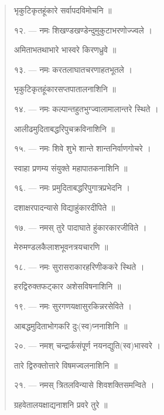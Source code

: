 \documentclass[a4paper, 11pt, oneside, french, landscape, twocolumn]{article}
\begin{document}
\begin{quotation}
\texthindi{भृकुटिकृतहूंकारे सर्वापदविमोचनि ॥}

\bigskip

\texthindi{१२}. --- \texthindi{नमः शिखण्डखण्डेन्दुमुकुटाभरणोज्ज्वले ।}

\texthindi{अमिताभतथाभारे भास्वरे किरणध्रुवे ॥}

\bigskip

\texthindi{१३}. --- \texthindi{नमः करतलाघातचरणाहतभूतले ।}

\texthindi{भृकुटिकृतहूंकारसप्तपातालनाशिनि ॥}

\bigskip

\texthindi{१४}. --- \texthindi{नमः कल्पान्तहुतभुग्ज्वालामालान्तरे स्थिते ।}

\texthindi{आलीढमुदिताबद्धरिपुचक्रविनाशिनि ॥}

\bigskip

\texthindi{१५}. --- \texthindi{नमः शिवे शुभे शान्ते शान्तनिर्वाणगोचरे ।}

\texthindi{स्वाहा प्रणम्य संयुक्ते महापातकनाशिनि ॥}

\bigskip

\texthindi{१६}. --- \texthindi{नमः प्रमुदिताबद्धरिपुगात्रप्रभेदनि ।}

\texthindi{दशाक्षरपादन्यासे विद्याहुंकारदीपिते ॥}

\bigskip

\texthindi{१७}. --- \texthindi{नमस् तुरे पादाघाते हुंकारकारजीविते ।}

\texthindi{मेरुमण्डलकैलाशभूवनत्रयचारणि ॥}

\bigskip

\texthindi{१८}. --- \texthindi{नमः सुरासराकारहरिणीककरे स्थिते ।}

\texthindi{हरद्विरुक्तफट्कार अशेसविषनाशिनि ॥}

\bigskip

\texthindi{१९}. --- \texthindi{नमः सुरगणयक्षासुरकिन्नरसेविते ।}

\texthindi{आबद्धमुदिताभोगकरि दुः(स्व)प्ननाशिनि ॥}

\bigskip

\texthindi{२०}. --- \texthindi{नमश् चन्द्रार्कसंपूर्ण नयनद्युति(स्व)भास्वरे ।}

\texthindi{तारे द्विरुक्तोत्तारे विषमज्वलनाशिनि ॥}

\bigskip

\texthindi{२१}. --- \texthindi{नमस् त्रितलविन्यासे शिवशक्तिसमन्विते ।}

\texthindi{ग्रहवेतालयक्षाद्यनाशनि प्रवरे तुरे ॥}

\bigskip


\end{quotation}
\end{document}
